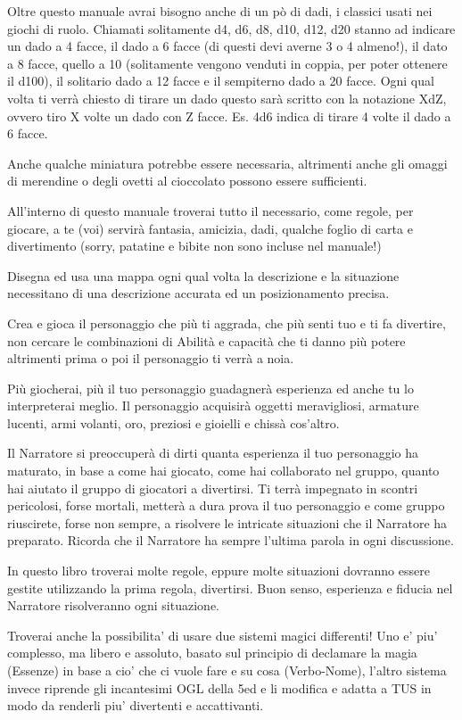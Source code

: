\documentclass[a4paper,11pt,twoside,openany]{book}
\begin{document}
Oltre questo manuale avrai bisogno anche di un pò di dadi, i classici usati nei giochi di ruolo.
Chiamati solitamente d4, d6, d8, d10, d12, d20 stanno ad indicare un dado a 4 facce, il dado a 6 facce (di questi devi averne 3 o 4 almeno!), il dato a 8 facce, quello a 10 (solitamente vengono venduti in coppia, per poter ottenere il d100), il solitario dado a 12 facce e il sempiterno dado a 20 facce.
Ogni qual volta ti verrà chiesto di tirare un dado questo sarà scritto con la notazione XdZ, ovvero tiro X volte un dado con Z facce. Es. 4d6 indica di tirare 4 volte il dado a 6 facce.

Anche qualche miniatura potrebbe essere necessaria, altrimenti anche gli omaggi di merendine o degli ovetti al cioccolato possono essere sufficienti.

All'interno di questo manuale troverai tutto il necessario, come regole, per giocare, a te (voi) servirà fantasia, amicizia, dadi, qualche foglio di carta e divertimento (sorry, patatine e bibite non sono incluse nel manuale!)

Disegna ed usa una mappa ogni qual volta la descrizione e la situazione necessitano di una descrizione accurata ed un posizionamento precisa.

Crea e gioca il personaggio che più ti aggrada, che più senti tuo e ti fa divertire, non cercare le combinazioni di Abilità e capacità che ti danno più potere altrimenti prima o poi il personaggio ti verrà a noia.

Più giocherai, più il tuo personaggio guadagnerà esperienza ed anche tu lo interpreterai meglio. Il personaggio acquisirà oggetti meravigliosi, armature lucenti, armi volanti, oro, preziosi e gioielli e chissà cos'altro.

Il Narratore si preoccuperà di dirti quanta esperienza il tuo personaggio ha maturato, in base a come hai giocato, come hai collaborato nel gruppo, quanto hai aiutato il gruppo di giocatori a divertirsi. Ti terrà impegnato in scontri pericolosi, forse mortali, metterà a dura prova il tuo personaggio e come gruppo riuscirete, forse non sempre, a risolvere le intricate situazioni che il Narratore ha preparato. Ricorda che il Narratore ha sempre l'ultima parola in ogni discussione.

In questo libro troverai molte regole, eppure molte situazioni dovranno essere gestite utilizzando la prima regola, divertirsi. Buon senso, esperienza e fiducia nel Narratore risolveranno ogni situazione.

Troverai anche la possibilita' di usare due sistemi magici differenti! Uno e' piu' complesso, ma libero e assoluto,  basato sul principio di declamare la magia (Essenze) in base a cio' che ci vuole fare e su cosa (Verbo-Nome), l'altro sistema invece riprende gli incantesimi OGL della 5ed e li modifica e adatta a TUS in modo da renderli piu' divertenti e accattivanti.
\end{document}
